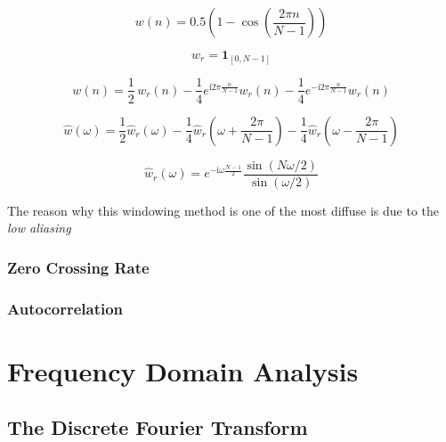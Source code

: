 \begin{equation}
w(n)= 0.5 \left(1 - \cos \left ( \frac{2 \pi n}{N-1} \right) \right) \label{eq:discrete_window_function}
\end{equation}

\begin{equation}
\label{eq:rectangular_function}
w_r = \mathbf{1}_{[0,N-1]}
\end{equation}

\begin{equation}
\label{eq:euler_formula}
w(n)= \frac{1}{2} \,w_r(n) -\frac{1}{4} e^{\mathrm{i}2\pi \frac{n}{N-1}} w_r(n) - \frac{1}{4}e^{-\mathrm{i}2\pi \frac{n}{N-1}} w_r(n)
\end{equation}

\begin{equation}
\label{eq:spectrum_ft}
\hat{w} (\omega) = \frac{1}{2} \hat{w}_r (\omega) - \frac{1}{4} \hat{w}_r \left(\omega + \frac{2\pi}{N-1}\right) - \frac{1}{4} \hat{w}_r \left(\omega - \frac{2\pi}{N-1}\right) 
\end{equation}

\begin{equation}
\label{eq:final_hann}
\hat{w}_r (\omega) = e^{-\mathrm{i} \omega \frac{N-1}{2}} \frac{\sin(N\omega/2)}{\sin(\omega/2)}
\end{equation}

The reason why this windowing method is one of the most diffuse is due to the \textit{low aliasing}

\subsubsection{Zero Crossing Rate}
\label{ssubs:Zero Crossing Rate}


\subsubsection{Autocorrelation}
\label{ssubs:autocorrelation}


\section{Frequency Domain Analysis}
\label{sec:freq_domain_analysis}


\subsection{The Discrete Fourier Transform}
\label{sub:discrete_fourier_transform}

